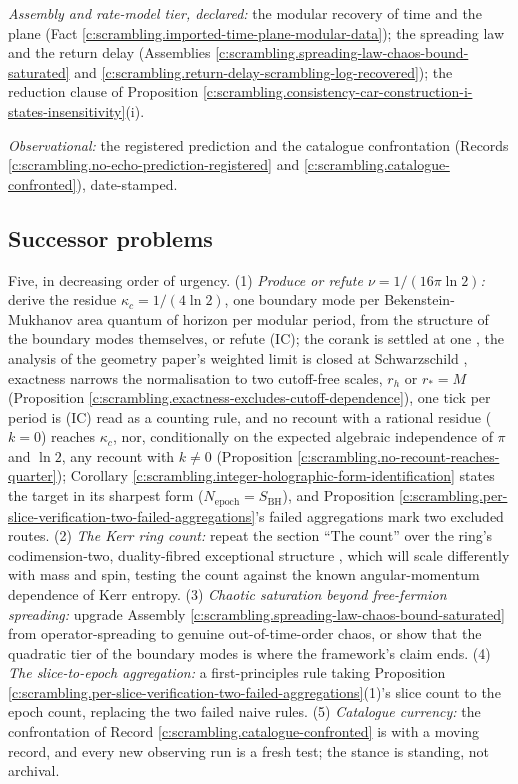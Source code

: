 \documentclass[11pt]{article}
\theoremstyle{definition}
\theoremstyle{plain}
\providecommand{\SBH}{}\renewcommand{\SBH}{S_{\mathrm{BH}}}
\begin{document}
\emph{Assembly and rate-model tier, declared:} the modular recovery of time and the plane (Fact \ref{c:scrambling.imported-time-plane-modular-data}); the spreading law and the return delay (Assemblies \ref{c:scrambling.spreading-law-chaos-bound-saturated} and \ref{c:scrambling.return-delay-scrambling-log-recovered}); the reduction clause of Proposition \ref{c:scrambling.consistency-car-construction-i-states-insensitivity}(i).

\emph{Observational:} the registered prediction and the catalogue confrontation (Records \ref{c:scrambling.no-echo-prediction-registered} and \ref{c:scrambling.catalogue-confronted}), date-stamped.

\subsection*{Successor problems}
\label{c:note.scrambling.setting-successor-problems}
Five, in decreasing order of urgency. (1) \emph{Produce or refute $\nu = 1/(16\pi\ln 2)$:} derive the residue $\kappa_c = 1/(4\ln 2)$, one boundary mode per Bekenstein-Mukhanov area quantum of horizon per modular period, from the structure of the boundary modes themselves, or refute (IC); the corank is settled at one \cite[\S 8.9]{ButlerT4}, the analysis of the geometry paper's weighted limit is closed at Schwarzschild \cite[\S 5.5]{ButlerT6}, exactness narrows the normalisation to two cutoff-free scales, $r_h$ or $r_* = M$ (Proposition \ref{c:scrambling.exactness-excludes-cutoff-dependence}), one tick per period is (IC) read as a counting rule, and no recount with a rational residue ($k = 0$) reaches $\kappa_c$, nor, conditionally on the expected algebraic independence of $\pi$ and $\ln 2$, any recount with $k \neq 0$ (Proposition \ref{c:scrambling.no-recount-reaches-quarter}); Corollary \ref{c:scrambling.integer-holographic-form-identification} states the target in its sharpest form ($N_{\mathrm{epoch}} = \SBH$), and Proposition \ref{c:scrambling.per-slice-verification-two-failed-aggregations}'s failed aggregations mark two excluded routes. (2) \emph{The Kerr ring count:} repeat the section ``The count'' over the ring's codimension-two, duality-fibred exceptional structure \cite[Conj.~6.6]{ButlerT6}, which will scale differently with mass and spin, testing the count against the known angular-momentum dependence of Kerr entropy. (3) \emph{Chaotic saturation beyond free-fermion spreading:} upgrade Assembly \ref{c:scrambling.spreading-law-chaos-bound-saturated} from operator-spreading to genuine out-of-time-order chaos, or show that the quadratic tier of the boundary modes is where the framework's claim ends. (4) \emph{The slice-to-epoch aggregation:} a first-principles rule taking Proposition \ref{c:scrambling.per-slice-verification-two-failed-aggregations}(1)'s slice count to the epoch count, replacing the two failed naive rules. (5) \emph{Catalogue currency:} the confrontation of Record \ref{c:scrambling.catalogue-confronted} is with a moving record, and every new observing run is a fresh test; the stance is standing, not archival.
\end{document}
